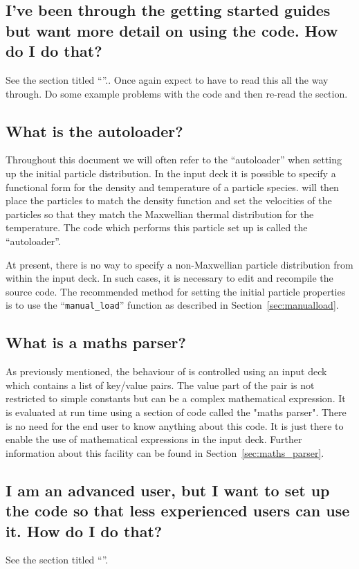 \documentclass[12pt,a4paper]{article}
\newcommand{\sectit}[1]{See the section titled ``{\bf\titleref{sec:#1}}''.}
\newcommand{\sect}[1]{Section~\ref{sec:#1}}
\newcommand{\code}[1]{{\texttt{#1}}}
\newcommand{\EPOCH}{{\color{warwickdark}\fontfamily{phv}\selectfont{EPOCH}}}
\begin{document}
\subsection{I've been through the getting started guides but want more detail
  on using the code. How do I do that?}
\sectit{endusers}. Once again expect to have to read this all the way through.
Do some example problems with the code and then re-read the section.

\subsection{What is the autoloader?}
Throughout this document we will often refer to the ``autoloader'' when
setting up the initial particle distribution. In the input deck it is
possible to specify a functional form for the density and temperature 
of a particle species. {\EPOCH} will then place the particles to match
the density function and set the velocities of the particles so that they
match the Maxwellian thermal distribution for the temperature.
The code which performs this particle set up is called the ``autoloader''.

At present, there is no way to specify a non-Maxwellian particle distribution
from within the input deck. In such cases, it is necessary to edit and
recompile the {\EPOCH} source code. The recommended method for setting
the initial particle properties is to use the ``\code{manual\_load}'' function
as described in \sect{manualload}.

\subsection{What is a maths parser?}
As previously mentioned, the behaviour of {\EPOCH} is controlled using an
input deck which contains a list of key/value pairs. The value part of the
pair is not restricted to simple constants but can be a complex mathematical
expression. It is evaluated at run time using a section of code called the
"maths parser". There is no need for the end user to know anything about this
code. It is just there to enable the use of mathematical expressions in the
input deck.
Further information about this facility can be found in
\sect{maths_parser}.

\subsection{I am an advanced user, but I want to set up the code so that less
  experienced users can use it. How do I do that?}
\sectit{customising}
\end{document}
